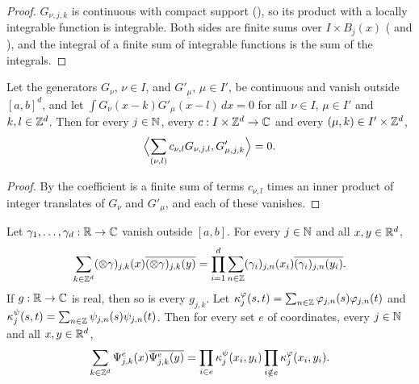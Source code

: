 \begin{proof}
\leanok
{}
$G_{\nu,j,k}$ is continuous with compact support (), so its product
with a locally integrable function is integrable. Both sides are finite sums over
$I \times B_j(x)$ ( and ), and the
integral of a finite sum of integrable functions is the sum of the integrals.
\end{proof}

\begin{lemma}
\label{lem:daub-rd-orthogonal-families}
\leanok
{}
Let the generators $G_\nu$, $\nu \in I$, and $G'_\mu$, $\mu \in I'$, be continuous and vanish
outside $[a, b]^d$, and let $\int G_\nu(x - k) \overline{G'_\mu(x - l)} \, dx = 0$ for all
$\nu \in I$, $\mu \in I'$ and $k, l \in \mathbb{Z}^d$. Then for every $j \in \mathbb{N}$, every
$c : I \times \mathbb{Z}^d \to \mathbb{C}$ and every $(\mu, k) \in I' \times \mathbb{Z}^d$,
\[
  \Bigl\langle \sum_{(\nu, l)} c_{\nu,l} G_{\nu,j,l}, G'_{\mu,j,k} \Bigr\rangle = 0 .
\]
\end{lemma}

\begin{proof}
\leanok
{}
By  the coefficient is a finite sum of terms $c_{\nu,l}$ times an
inner product of integer translates of $G_\nu$ and $G'_\mu$, and each of these vanishes.
\end{proof}

\begin{lemma}
\label{lem:daub-rd-tensor-kernel}
\leanok
{}
Let $\gamma_1, \dots, \gamma_d : \mathbb{R} \to \mathbb{C}$ vanish outside $[a, b]$. For every $j \in \mathbb{N}$ and all
$x, y \in \mathbb{R}^d$,
\[
  \sum_{k \in \mathbb{Z}^d} (\otimes \gamma)_{j,k}(x) \overline{(\otimes \gamma)_{j,k}(y)}
  = \prod_{i=1}^d \sum_{n \in \mathbb{Z}} (\gamma_i)_{j,n}(x_i) \overline{(\gamma_i)_{j,n}(y_i)} .
\]
If $g : \mathbb{R} \to \mathbb{C}$ is real, then so is every $g_{j,k}$. Let
$\kappa^\varphi_j(s, t) = \sum_{n \in \mathbb{Z}} \varphi_{j,n}(s) \varphi_{j,n}(t)$ and
$\kappa^\psi_j(s, t) = \sum_{n \in \mathbb{Z}} \psi_{j,n}(s) \psi_{j,n}(t)$. Then for every set $e$ of
coordinates, every $j \in \mathbb{N}$ and all $x, y \in \mathbb{R}^d$,
\[
  \sum_{k \in \mathbb{Z}^d} \Psi^e_{j,k}(x) \overline{\Psi^e_{j,k}(y)}
  = \prod_{i \in e} \kappa^\psi_j(x_i, y_i) \prod_{i \notin e} \kappa^\varphi_j(x_i, y_i) .
\]
\end{lemma}

